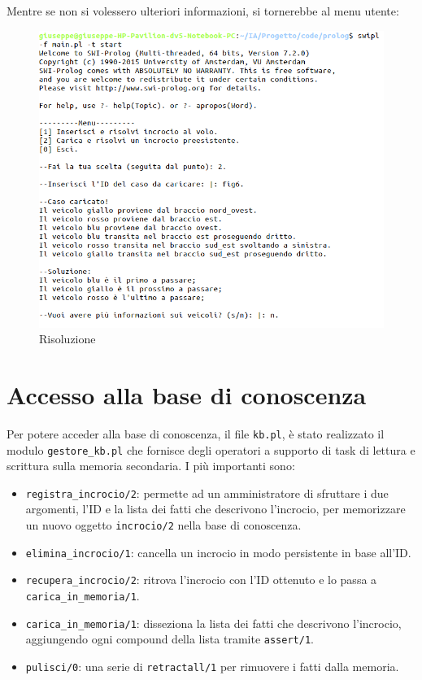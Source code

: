 \clearpage

Mentre se non si volessero ulteriori informazioni, si tornerebbe al menu utente:

\begin{figure}[!htb]
	\centering
	\includegraphics[width=.9\textwidth]{images/shell/info1}
	\caption{Risoluzione}
\end{figure}


\section{Accesso alla base di conoscenza}
Per potere acceder alla base di conoscenza, il file \texttt{kb.pl}, è stato realizzato il modulo \texttt{gestore\_kb.pl} che fornisce degli operatori a supporto di task di lettura e scrittura sulla memoria secondaria. I più importanti sono:
\begin{itemize}
	\item \texttt{registra\_incrocio/2}: permette ad un amministratore di sfruttare i due argomenti, l'ID e la lista dei fatti che descrivono l'incrocio, per memorizzare un nuovo oggetto \texttt{incrocio/2} nella base di conoscenza.
	\item \texttt{elimina\_incrocio/1}: cancella un incrocio in modo persistente in base all'ID.
	\item \texttt{recupera\_incrocio/2}: ritrova l'incrocio con l'ID ottenuto e lo passa a \texttt{carica\_in\_memoria/1}.
	\item \texttt{carica\_in\_memoria/1}: disseziona la lista dei fatti che descrivono l'incrocio, aggiungendo ogni compound della lista tramite \texttt{assert/1}.
	\item \texttt{pulisci/0}: una serie di \texttt{retractall/1} per rimuovere i fatti dalla memoria.
\end{itemize}

